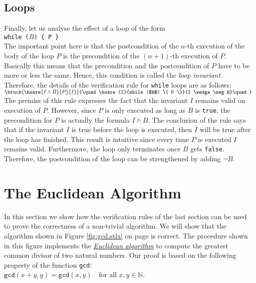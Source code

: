 \subsection{Loops}
Finally, let us analyse the effect of a loop of the form
\\[0.2cm]
\hspace*{1.3cm}
\texttt{while ($B$) \{ P \}} 
\\[0.2cm]
The important point here is that the postcondition of the $n$-th
execution of the body of the loop $P$ is the precondition of the $(n\!+\!1)$-th
execution of $P$.  Basically this means that the precondition and the
postcondition of $P$ have to be more or less the same.
Hence, this condition is called the \emph{loop invariant}.  Therefore,
the details of the verification rule for \texttt{while} loops are as follows:
\\[0.2cm]
\hspace*{1.3cm}
$\bruch{\hoare{I \wedge B}{P}{I}}{\quad \hoare{I}{while ($B$) \{ P \}}{I \wedge \neg B}\quad}$
\\[0.2cm]
The premiss of this rule expresses the fact that the invariant $I$ remains valid on execution of $P$.
However, since $P$ is only executed as long as $B$ is \texttt{true}, the precondition for $P$ is actually 
the formula $I \wedge B$.  The conclusion of the rule says that if the invariant $I$ is true before
the loop is executed, then $I$ will be true after the loop has finished.  This result is intuitive
since every time $P$ is executed $I$ remains valid.  Furthermore, the loop only terminates once $B$
gets \texttt{false}.  Therefore, the postcondition of the loop can be strengthened by adding $\neg B$.



\section{The Euclidean  Algorithm}
In this section we show how the verification rules of the last section can be used to prove the
correctness of a non-trivial algorithm.
We will show that the algorithm shown in Figure \ref{fig:gcd.stlx} on page \pageref{fig:gcd.stlx} is correct.
The procedure shown in this figure implements the
\href{http://en.wikipedia.org/wiki/Euclidean_algorithm}{\emph{Euclidean algorithm}}
to compute the greatest common divisor of two natural numbers.  Our proof is based on the following
property of the function \texttt{gcd}:
\\[0.2cm]
\hspace*{1.3cm}
$\texttt{gcd}(x + y, y) = \texttt{gcd}(x,y) \quad \mbox{for all $x, y \in \mathbb{N}$}$.


